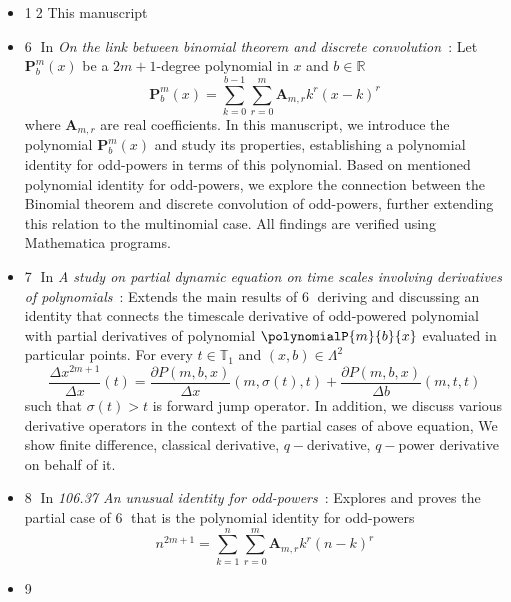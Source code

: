 \begin{itemize}
    \item {\Large \textcircled{\normalsize 12}} This manuscript
    \item {\Large \textcircled{\normalsize 6}}
    In \textit{On the link between binomial theorem and discrete convolution}~\cite{on_the_link_between_binomial_theorem_and_discrete_convolution}:
    Let $\mathbf{P}^{m}_{b}(x)$ be a $2m+1$-degree polynomial in $x$ and $b \in \mathbb{R}$
    \[
        \mathbf{P}^{m}_{b}(x) = \sum_{k=0}^{b-1} \sum_{r=0}^{m} \mathbf{A}_{m,r} k^r (x-k)^r
    \]
    where $\mathbf{A}_{m,r}$ are real coefficients.
    In this manuscript, we introduce the polynomial $\mathbf{P}^{m}_{b}(x)$ and study its properties,
    establishing a polynomial identity for odd-powers in terms of this polynomial.
    Based on mentioned polynomial identity for odd-powers,
    we explore the connection between the Binomial theorem and discrete convolution of odd-powers,
    further extending this relation to the multinomial case.
    All findings are verified using Mathematica programs.
    \item {\Large \textcircled{\normalsize 7}}
    In \textit{A study on partial dynamic equation on time scales involving derivatives
    of polynomials}~\cite{study_on_partial_dynamic_eq_on_time_scales_with_poly_derivatives}:
    Extends the main results of {\Large \textcircled{\normalsize 6}} deriving and discussing
    an identity that connects the timescale derivative of odd-powered polynomial
    with partial derivatives of polynomial $\polynomialP{m}{b}{x}$ evaluated in particular points.
    For every $t\in\mathbb{T}_1$ and $(x,b) \in \Lambda^2$
    \[
        \frac{\Delta x^{2m+1}}{\Delta x}(t) =
        \frac{\partial P(m,b,x)}{\Delta x} (m, \sigma(t), t) +
        \frac{\partial P(m,b,x)}{\Delta b} (m, t, t)
    \]
    such that $\sigma(t) > t$ is forward jump operator.
    In addition, we discuss various derivative operators in the context of the partial cases of above equation,
    We show finite difference, classical derivative, $q-$derivative, $q-$power derivative on behalf of it.
    \item {\Large \textcircled{\normalsize 8}}
    In \textit{106.37 An unusual identity for odd-powers}~\cite{unusual_identity_for_odd_powers}:
    Explores and proves the partial case of {\Large \textcircled{\normalsize 6}}
    that is the polynomial identity for odd-powers
    \[
        n^{2m+1} = \sum_{k=1}^{n} \sum_{r=0}^{m} \mathbf{A}_{m,r} k^r (n-k)^r
    \]
    \item {\Large \textcircled{\normalsize 9}}

\end{itemize}
